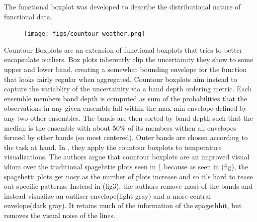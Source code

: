\begin{figure}
\end{figure}



The functional boxplot was developed to describe the distributional nature of functional data\cite{sun2011}. 


\begin{figure}
\texttt{[image: figs/countour\_weather.png]}
\label{fig:countour}
\end{figure}
Countour Boxplots \cite{whitaker13} are an extension of functional boxplots that tries to better encapsulate outliers. Box plots inherently clip the uncertainity they show to some upper and lower band, 
creating a somewhat bounding envelope for the function that looks fairly
regular when aggregated. Countour boxplots aim instead to capture the
variablity of the uncertainity via a band depth ordering metric. Each ensemble members band depth is computed as sum of the probabilities that the observations in any given ensemble fall within the max-min envelope defined by any two other ensembles. The bands are then sorted by band depth such that the median is the ensemble with about 50\% of its members withen all envelopes formed by other bands (so most centered). Outer bands are chosen according to the task at hand. In \cite{whitaker13}, they apply the countour boxplots to temperature visualizations. %
The authors argue that countour boxplots are an improved visual idiom over the traditional spagehttie plots seen in \ref{fig:countour} because as seen in (fig), the spagehetti plots get nosy as the number of plots increase and so it's hard to tease out specific patterns. Instead in (fig3), the authors remove most of the bands and instead visualize an outliser envelope(light gray) and a more central envelope(dark gray). It retains much of the information of the spagethhit, but removes the visual noise of the lines.  
